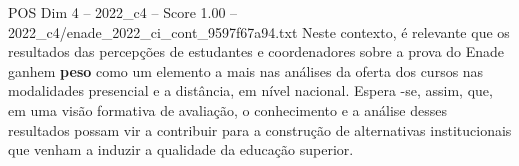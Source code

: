 \begin{textsample}{POS Dim 4 – 2022\_c4 – Score 1.00 – 2022\_c4/enade\_2022\_ci\_cont\_9597f67a94.txt}
Neste contexto, é relevante que os resultados das percepções de estudantes e coordenadores sobre a prova do Enade ganhem \textbf{peso} como um elemento a mais nas análises da oferta dos cursos nas modalidades presencial e a distância, em nível nacional.
Espera -se, assim, que, em uma visão formativa de avaliação, o conhecimento e a análise desses resultados possam vir a contribuir para a construção de alternativas institucionais que venham a induzir a qualidade da educação superior.

\end{textsample}

